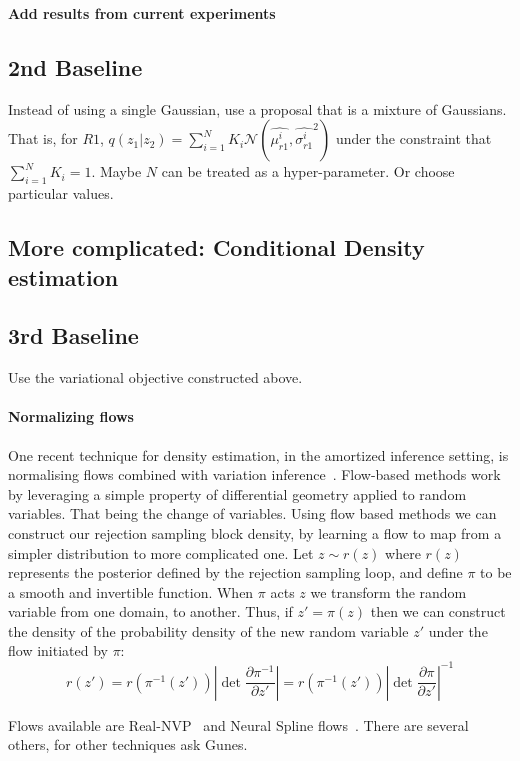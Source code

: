\documentclass{article}
\begin{document}
 \textbf{Add results from current experiments}


\subsection{2nd Baseline}
Instead of using a single Gaussian, use a proposal that is a mixture of Gaussians. 
That is, for $R1$,   $q(z_{1} | z_{2}) = \sum^{N}_{i=1}K_{i}\mathcal{N}(\hat{\mu^{i}_{r1}},  \hat{\sigma^{i}_{r1}}^{2})$
under the constraint that $\sum^{N}_{i=1}K_{i} = 1$. Maybe $N$ can be treated as a hyper-parameter. 
Or choose particular values.
\subsection{More complicated: Conditional Density estimation}

\subsection{3rd Baseline}
 
Use the variational objective constructed above. 

\paragraph{Normalizing flows} One recent technique for density estimation, in the amortized inference setting,
is normalising flows combined with variation inference~\cite{rezende2015variational}.
Flow-based methods work by leveraging a simple property of differential geometry applied 
to random variables. 
That being the change of variables. 
Using flow based methods we can construct our rejection sampling block density, by learning a flow to map from
a simpler distribution to more complicated one.
Let $z \sim r(z)$ where $r(z)$ represents the posterior defined by the rejection
sampling loop, and define $\pi$ to be a smooth and invertible function.
When $\pi$ acts $z$ we transform the random variable from one domain, to another. 
Thus, if $z\prime = \pi(z)$ then we can construct the density of  
the probability density of the new random variable $z\prime$ under the flow initiated by $\pi$: 
\begin{equation}
r(z\prime) = r(\pi^{-1}(z\prime)) \left|\det \frac{\partial \pi^{-1}}{\partial z'}\right| = r(\pi^{-1}(z\prime)) \left|\det \frac{\partial \pi}{\partial z\prime}\right|^{-1} 
\end{equation}

Flows available are Real-NVP~\cite{dinh2016density} and Neural Spline flows~\cite{durkan2019neural}.
There are several others, for other techniques ask Gunes. 
\end{document}
